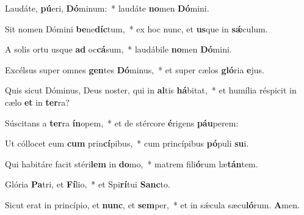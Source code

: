 \item Laudáte, \textbf{pú}eri, \textbf{Dó}minum:~* laudáte \textbf{no}men \textbf{Dó}mini.

\item Sit nomen Dómini \textbf{be}ne\textbf{díc}tum,~* ex hoc nunc, et \textbf{us}que in \textbf{sǽ}culum.

\item A solis ortu usque \textbf{ad} oc\textbf{cá}sum,~* laudábile \textbf{no}men \textbf{Dó}mini.

\item Excélsus super omnes \textbf{gen}tes \textbf{Dó}minus,~* et super cælos \textbf{gló}ria \textbf{e}jus.

\item Quis sicut Dóminus, Deus noster, qui in \textbf{al}tis \textbf{há}bitat,~* et humília réspicit in cælo \textbf{et} in \textbf{ter}ra?

\item Súscitans a \textbf{ter}ra \textbf{ín}opem,~* et de stércore \textbf{é}rigens \textbf{páu}perem:

\item Ut cóllocet eum \textbf{cum} prin\textbf{cí}pibus,~* cum princípibus \textbf{pó}puli \textbf{su}i.

\item Qui habitáre facit stéri\textbf{lem} in \textbf{do}mo,~* matrem fili\textbf{ó}rum læ\textbf{tán}tem.

\item Glória \textbf{Pa}tri, et \textbf{Fí}lio,~* et Spi\textbf{rí}tui \textbf{Sanc}to.

\item Sicut erat in princípio, et \textbf{nunc}, et \textbf{sem}per,~* et in sǽcula sæcu\textbf{ló}rum. \textbf{A}men.
